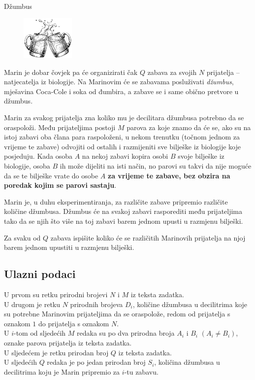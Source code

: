 \begin{statement}[
  problempoints=110,
  timelimit=1 sekunda,
  memorylimit=512 MiB,
]{Džumbus}

\setlength\intextsep{-0.1cm}
\begin{figure}
\centering
\includegraphics[width=0.23\textwidth]{img/dzumbus.png}
\end{figure}

Marin je dobar čovjek pa će organizirati čak $Q$ zabava za svojih $N$ prijatelja
-- natjecatelja iz biologije. Na Marinovim će se zabavama posluživati
\textit{džumbus}, mješavina Coca-Cole i soka od đumbira, a zabave se i same
obično pretvore u džumbus.

Marin za svakog prijatelja zna koliko mu je decilitara džumbusa potrebno da se
oraspoloži. Među prijateljima postoji $M$ parova za koje znamo da će se, ako su
na istoj zabavi oba člana para raspoloženi, u nekom trenutku (točnom jednom za
vrijeme te zabave) odvojiti od ostalih i razmijeniti sve bilješke iz biologije
koje posjeduju. Kada osoba $A$ na nekoj zabavi kopira osobi $B$ svoje bilješke
iz biologije, osoba $B$ ih može dijeliti na isti način, no parovi su takvi da
nije moguće da se te bilješke vrate do osobe $A$ \textbf{za vrijeme te zabave,
bez obzira na poredak kojim se parovi sastaju}.

Marin je, u duhu eksperimentiranja, za različite zabave pripremio različite
količine džumbusa. Džumbus će na svakoj zabavi rasporediti među prijateljima
tako da se njih što više na toj zabavi barem jednom upusti u razmjenu bilješki.

Za svaku od $Q$ zabava ispišite koliko će se različitih Marinovih prijatelja na
njoj barem jednom upustiti u razmjenu bilješki.
\subsection*{Ulazni podaci}
U prvom su retku prirodni brojevi $N$ i $M$ iz teksta zadatka. \\
U drugom je retku $N$ prirodnih brojeva $D_i$, količine džumbusa u
decilitrima koje su potrebne Marinovim prijateljima da se oraspolože, redom
od prijatelja s oznakom $1$ do prijatelja s oznakom $N$. \\
U $i$-tom od sljedećih $M$ redaka su po dva prirodna broja $A_i$ i $B_i$
$(A_i \ne B_i)$, oznake parova prijatelja iz teksta zadatka. \\
U sljedećem je retku prirodan broj $Q$ iz teksta zadatka. \\
U sljedećih $Q$ redaka je po jedan prirodan broj $S_i$, količina džumbusa u
decilitrima koju je Marin pripremio za $i$-tu zabavu.



\end{statement}

